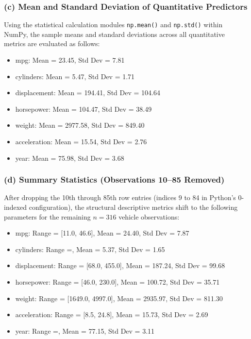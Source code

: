 \documentclass[12pt,a4paper]{article}
\begin{document}
\subsubsection*{(c) Mean and Standard Deviation of Quantitative Predictors}

Using the statistical calculation modules \texttt{np.mean()} and \texttt{np.std()} within NumPy, the sample means and standard deviations across all quantitative metrics are evaluated as follows:

\begin{itemize}
    \item mpg: Mean = 23.45, Std Dev = 7.81
    \item cylinders: Mean = 5.47, Std Dev = 1.71
    \item displacement: Mean = 194.41, Std Dev = 104.64
    \item horsepower: Mean = 104.47, Std Dev = 38.49
    \item weight: Mean = 2977.58, Std Dev = 849.40
    \item acceleration: Mean = 15.54, Std Dev = 2.76
    \item year: Mean = 75.98, Std Dev = 3.68
\end{itemize}

\subsubsection*{(d) Summary Statistics (Observations 10--85 Removed)}

After dropping the 10th through 85th row entries (indices 9 to 84 in Python's 0-indexed configuration), the structural descriptive metrics shift to the following parameters for the remaining $n=316$ vehicle observations:

\begin{itemize}
    \item mpg: Range = [11.0, 46.6], Mean = 24.40, Std Dev = 7.87
    \item cylinders: Range =, Mean = 5.37, Std Dev = 1.65
    \item displacement: Range = [68.0, 455.0], Mean = 187.24, Std Dev = 99.68
    \item horsepower: Range = [46.0, 230.0], Mean = 100.72, Std Dev = 35.71
    \item weight: Range = [1649.0, 4997.0], Mean = 2935.97, Std Dev = 811.30
    \item acceleration: Range = [8.5, 24.8], Mean = 15.73, Std Dev = 2.69
    \item year: Range =, Mean = 77.15, Std Dev = 3.11
\end{itemize}
\end{document}
